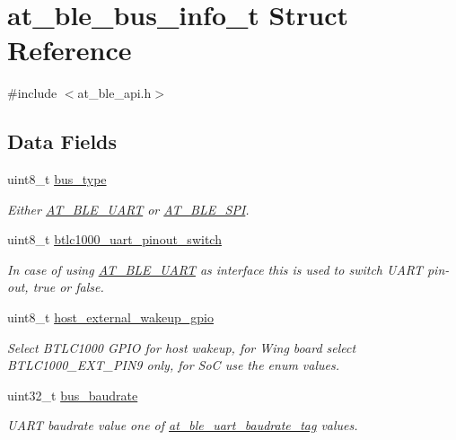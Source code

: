 \hypertarget{structat__ble__bus__info__t}{}\section{at\+\_\+ble\+\_\+bus\+\_\+info\+\_\+t Struct Reference}
\label{structat__ble__bus__info__t}


{\ttfamily \#include $<$at\+\_\+ble\+\_\+api.\+h$>$}

\subsection*{Data Fields}
\begin{DoxyCompactItemize}
\item 
uint8\+\_\+t \mbox{\hyperlink{structat__ble__bus__info__t_acd9e3a84de3da90418d97b78eb84d2bd}{bus\+\_\+type}}
\begin{DoxyCompactList}\small\item\em Either \mbox{\hyperlink{at__ble__api_8h_a42bc6bd8b2502ca57a35ba77d29bad8ca8fe67bfab4b12ad57597bb27c46ebe1f}{A\+T\+\_\+\+B\+L\+E\+\_\+\+U\+A\+RT}} or \mbox{\hyperlink{at__ble__api_8h_a42bc6bd8b2502ca57a35ba77d29bad8ca9aa7efedf4d5a083f67fa25350141e24}{A\+T\+\_\+\+B\+L\+E\+\_\+\+S\+PI}}. \end{DoxyCompactList}\item 
uint8\+\_\+t \mbox{\hyperlink{structat__ble__bus__info__t_adcb4737ceda8181e0320a9decbb72f7f}{btlc1000\+\_\+uart\+\_\+pinout\+\_\+switch}}
\begin{DoxyCompactList}\small\item\em In case of using \mbox{\hyperlink{at__ble__api_8h_a42bc6bd8b2502ca57a35ba77d29bad8ca8fe67bfab4b12ad57597bb27c46ebe1f}{A\+T\+\_\+\+B\+L\+E\+\_\+\+U\+A\+RT}} as interface this is used to switch U\+A\+RT pin-\/out, true or false. \end{DoxyCompactList}\item 
uint8\+\_\+t \mbox{\hyperlink{structat__ble__bus__info__t_a935a87589314d156349378379263270c}{host\+\_\+external\+\_\+wakeup\+\_\+gpio}}
\begin{DoxyCompactList}\small\item\em Select B\+T\+L\+C1000 G\+P\+IO for host wakeup, for Wing board select B\+T\+L\+C1000\+\_\+\+E\+X\+T\+\_\+\+P\+I\+N9 only, for SoC use the enum values. \end{DoxyCompactList}\item 
uint32\+\_\+t \mbox{\hyperlink{structat__ble__bus__info__t_a9fd6a700bdcd24eac39b919db84beeaa}{bus\+\_\+baudrate}}
\begin{DoxyCompactList}\small\item\em U\+A\+RT baudrate value one of \mbox{\hyperlink{at__ble__api_8h_af9f45be471328ddc873fa3b6d3fe865a}{at\+\_\+ble\+\_\+uart\+\_\+baudrate\+\_\+tag}} values. \end{DoxyCompactList}\end{DoxyCompactItemize}


